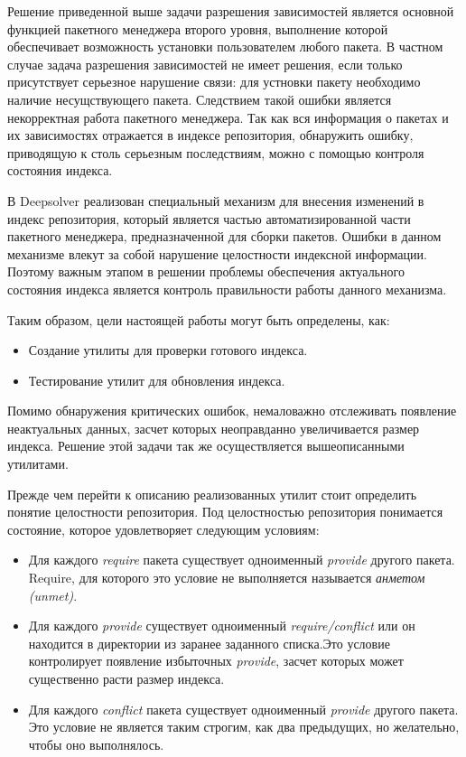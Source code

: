\documentclass[a4paper]{article}
\begin{document}
Решение приведенной выше задачи разрешения зависимостей является основной функцией 
пакетного менеджера второго уровня, выполнение которой обеспечивает возможность 
установки пользователем любого пакета. В частном случае задача разрешения зависимостей не
имеет решения, если только присутствует серьезное нарушение связи: для
устновки пакету необходимо наличие несущствующего пакета. Следствием 
такой ошибки является некорректная работа пакетного менеджера. Так как 
вся информация о пакетах и их зависимостях отражается в индексе репозитория, 
обнаружить ошибку, приводящую к столь серьезным последствиям, можно с помощью 
контроля состояния индекса.

В  Deepsolver реализован специальный механизм для внесения изменений в индекс 
репозитория, который является частью автоматизированной части пакетного менеджера, 
предназначенной для сборки пакетов. Ошибки в данном механизме влекут за собой 
нарушение целостности индексной информации. Поэтому важным этапом в решении 
проблемы обеспечения актуального состояния индекса является контроль правильности 
работы данного механизма. 

Таким образом, цели настоящей работы могут быть определены, как:
\begin{itemize}
\item
Создание утилиты для проверки готового индекса.
\item
Тестирование утилит для обновления индекса.
\end{itemize}

Помимо обнаружения критических ошибок, немаловажно отслеживать появление 
неактуальных данных, засчет которых неоправданно увеличивается размер индекса. 
Решение этой задачи так же осуществляется вышеописанными утилитами.%

Прежде чем перейти к описанию реализованных утилит стоит
определить понятие целостности репозитория. Под целостностью
репозитория понимается состояние, которое удовлетворяет следующим
условиям:
\begin{itemize}
\item{Для каждого \textit{require} пакета существует одноименный \textit{provide} 
другого пакета. Require, для которого это условие не выполняется
называется \textit{анметом (unmet)}. }
\item{Для каждого \textit{provide} существует одноименный \textit{require/conflict} или
он находится в директории из заранее заданного списка.Это условие 
контролирует появление избыточных \textit{provide}, засчет которых
может существенно расти размер индекса.}
\item{Для каждого \textit{conflict} пакета существует одноименный \textit{provide} 
другого пакета. Это условие не является таким строгим, как два предыдущих,
но желательно, чтобы оно выполнялось. }
\end{itemize}
\end{document}
